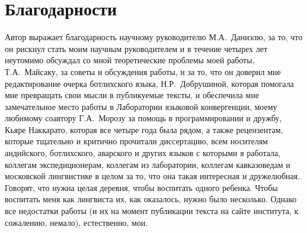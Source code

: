 \section*{Благодарности}
Автор выражает благодарность научному руководителю М.А.~Даниэлю, за то, что он рискнул стать моим научным руководителем и в течение четырех лет неутомимо обсуждал со мной теоретические проблемы моей работы, Т.А.~Майсаку, за советы и обсуждения работы, и за то, что он доверил мне редактирование очерка ботлихского языка, Н.Р.~Добрушиной, которая помогала мне превращать свои мысли в публикуемые тексты, и обеспечила мне замечательное место работы в Лаборатории языковой конвергенции, моему любимому соавтору Г.А.~Морозу за помощь в программировании и дружбу, Кьяре Наккарато, которая все четыре года была рядом, а также рецензентам, которые тщательно и критично прочитали диссертацию, всем носителям андийского, ботлихского, аварского и других языков с которыми я работала, коллегам экспедиционерам, коллегам из лаборатории, коллегам кавказоведам и московской лингвистике в целом за то, что она такая интересная и дружелюбная. Говорят, что нужна целая деревня, чтобы воспитать одного ребенка. Чтобы воспитать меня как лингвиста их, как оказалось, нужно было несколько. Однако все недостатки работы (и их на момент публикации текста на сайте института, к сожалению, немало), естественно, мои.
